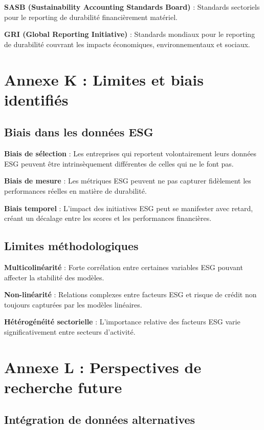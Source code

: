 \textbf{SASB (Sustainability Accounting Standards Board)} : Standards sectoriels pour le reporting de durabilité financièrement matériel.

\textbf{GRI (Global Reporting Initiative)} : Standards mondiaux pour le reporting de durabilité couvrant les impacts économiques, environnementaux et sociaux.

\section{Annexe K : Limites et biais identifiés}

\subsection{Biais dans les données ESG}

\textbf{Biais de sélection} : Les entreprises qui reportent volontairement leurs données ESG peuvent être intrinsèquement différentes de celles qui ne le font pas.

\textbf{Biais de mesure} : Les métriques ESG peuvent ne pas capturer fidèlement les performances réelles en matière de durabilité.

\textbf{Biais temporel} : L'impact des initiatives ESG peut se manifester avec retard, créant un décalage entre les scores et les performances financières.

\subsection{Limites méthodologiques}

\textbf{Multicolinéarité} : Forte corrélation entre certaines variables ESG pouvant affecter la stabilité des modèles.

\textbf{Non-linéarité} : Relations complexes entre facteurs ESG et risque de crédit non toujours capturées par les modèles linéaires.

\textbf{Hétérogénéité sectorielle} : L'importance relative des facteurs ESG varie significativement entre secteurs d'activité.

\section{Annexe L : Perspectives de recherche future}

\subsection{Intégration de données alternatives}

